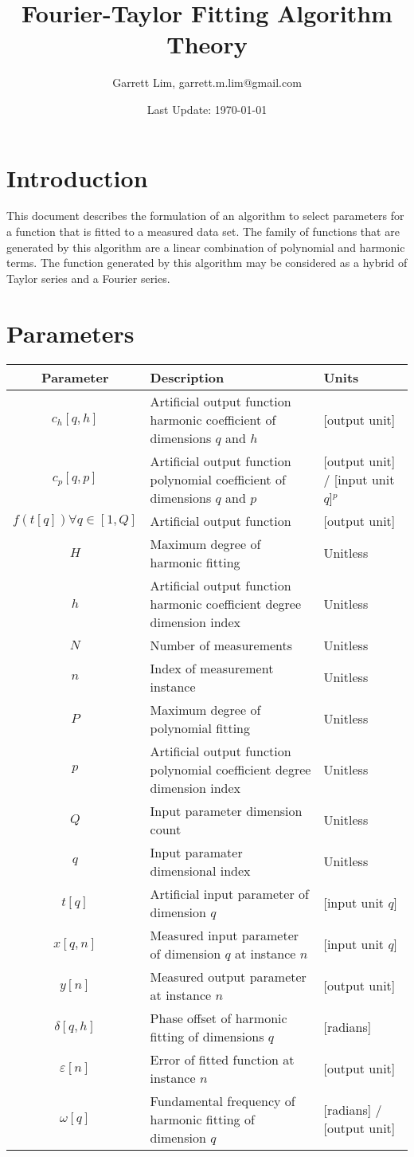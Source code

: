 \documentclass{article}
\title{Fourier-Taylor Fitting Algorithm Theory}
\author{Garrett Lim, garrett.m.lim@gmail.com}
\date{Last Update: \today}
\begin{document}
\maketitle

\section{Introduction}
\par{This document describes the formulation of an algorithm to select parameters for a function that is fitted to a measured data set. The family of functions that are generated by this algorithm are a linear combination of polynomial and harmonic terms. The function generated by this algorithm may be considered as a hybrid of Taylor series and a Fourier series.}

\section{Parameters}
\begin{table}[htbp]
\begin{tabularx}{\linewidth}{cXl}
Parameter&Description&Units\\
\hline
$c_h\left[q, h\right]$&Artificial output function harmonic coefficient of dimensions $q$ and $h$&[output unit]\\
$c_p\left[q, p\right]$&Artificial output function polynomial coefficient of dimensions $q$ and $p$&[output unit] / [input unit $q$]$^p$\\
$f\left(t\left[q\right]\right) \forall q \in \left[1, Q\right]$&Artificial output function&[output unit]\\
$H$&Maximum degree of harmonic fitting&Unitless\\
$h$&Artificial output function harmonic coefficient degree dimension index&Unitless\\
$N$&Number of measurements&Unitless\\
$n$&Index of measurement instance&Unitless\\
$P$&Maximum degree of polynomial fitting&Unitless\\
$p$&Artificial output function polynomial coefficient degree dimension index&Unitless\\
$Q$&Input parameter dimension count&Unitless\\
$q$&Input paramater dimensional index&Unitless\\
$t\left[q\right]$&Artificial input parameter of dimension $q$&[input unit $q$]\\
$x\left[q, n\right]$&Measured input parameter of dimension $q$ at instance $n$&[input unit $q$]\\
$y\left[n\right]$&Measured output parameter at instance $n$&[output unit]\\
$\delta\left[q, h\right]$&Phase offset of harmonic fitting of dimensions $q$&[radians]\\
$\varepsilon\left[n\right]$&Error of fitted function at instance $n$&[output unit]\\
$\omega\left[q\right]$&Fundamental frequency of harmonic fitting of dimension $q$&[radians] / [output unit]
\end{tabularx}
\end{table}
\end{document}
